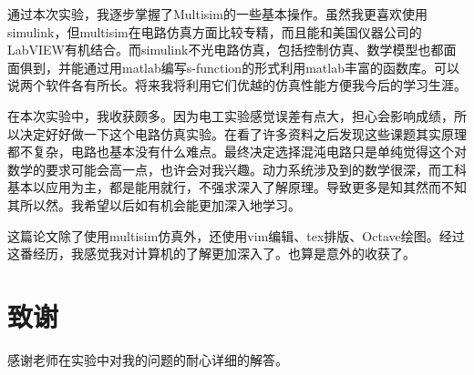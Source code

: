 \documentclass{article}
\begin{document}
通过本次实验，我逐步掌握了Multisim的一些基本操作。虽然我更喜欢使用simulink，但multisim在电路仿真方面比较专精，而且能和美国仪器公司的LabVIEW有机结合。而simulink不光电路仿真，包括控制仿真、数学模型也都面面俱到，并能通过用matlab编写s-function的形式利用matlab丰富的函数库。可以说两个软件各有所长。将来我将利用它们优越的仿真性能方便我今后的学习生涯。

在本次实验中，我收获颇多。因为电工实验感觉误差有点大，担心会影响成绩，所以决定好好做一下这个电路仿真实验。在看了许多资料之后发现这些课题其实原理都不复杂，电路也基本没有什么难点。最终决定选择混沌电路只是单纯觉得这个对数学的要求可能会高一点，也许会对我兴趣。动力系统涉及到的数学很深，而工科基本以应用为主，都是能用就行，不强求深入了解原理。导致更多是知其然而不知其所以然。我希望以后如有机会能更加深入地学习。

这篇论文除了使用multisim仿真外，还使用vim编辑、tex排版、Octave绘图。经过这番经历，我感觉我对计算机的了解更加深入了。也算是意外的收获了。

\section{致谢}%
\label{sec:致谢}

感谢老师在实验中对我的问题的耐心详细的解答。


\end{document}
